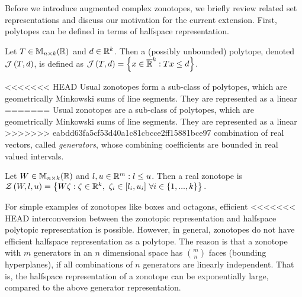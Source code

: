 
Before we introduce augmented complex zonotopes, we briefly review
related set representations and discuss our motivation for the
current extension. First, polytopes can be defined in terms of halfspace representation.
%
\begin{definition}
Let $T\in\mathbb{M}_{n\times k}(\mathbb{\mathbb{R}})$ and $d\in\mathbb{R}^k$.  Then a (possibly
unbounded) polytope, denoted $\mathcal{J}\left(T,d\right)$, is defined as
$\mathcal{J}\left(T,d\right) = \left\{x\in\mathbb{\overline{R}}^k: Tx\leq d\right\}$.
\end{definition}
%
<<<<<<< HEAD
Usual zonotopes form a sub-class of polytopes, which are geometrically
Minkowski sums of line segments. They are represented as a linear
=======
Usual zonotopes are a sub-class of polytopes, which are geometrically
Minkowski sums of line segments.  They are represented as a linear
>>>>>>> eabdd63fa5cf53d40a1c81cbcce2ff15881bce97
combination of real vectors, called \emph{generators}, whose combining
coefficients are bounded in real valued intervals.
\begin{definition}
Let $W\in\mathbb{M}_{n\times k}(\mathbb{\mathbb{R}})$ and $l,u\in\mathbb{R}^m: l\leq u$.  Then 
 a real zonotope is
$\mathcal{Z}\left(W,l,u\right) = \left\{W\zeta: \zeta\in\mathbb{R}^k,~\zeta_i\in[l_i,u_i]~\forall i\in \{1,...,k\}\right\}.$
\end{definition}
%
For simple examples of zonotopes like boxes and octagons, efficient
<<<<<<< HEAD
interconversion between the zonotopic representation and halfspace polytopic representation is possible.  
However, in general,
zonotopes do not have efficient halfspace representation as a
polytope.  The reason is that a zonotope with $m$ generators in an $n$
dimensional space has ${m}\choose{n}$ faces (bounding
hyperplanes), if all combinations of $n$ generators are linearly
independent.  That is, the halfspace representation of a zonotope can
be exponentially large, compared to the above generator representation. 

